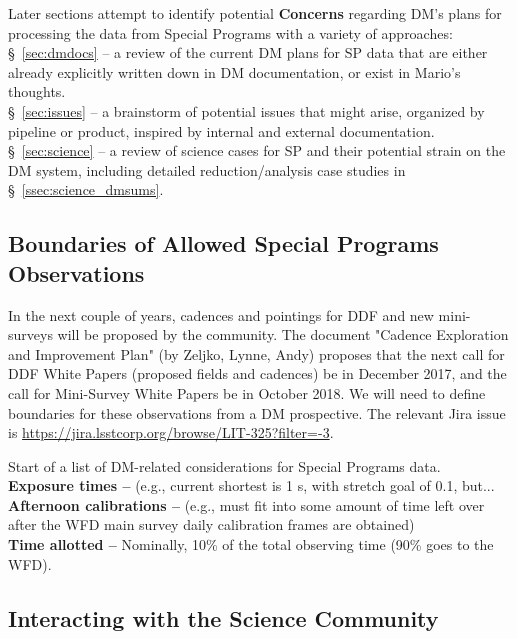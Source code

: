 \documentclass[DM,lsstdraft,toc]{lsstdoc}
\begin{document}
Later sections attempt to identify potential \textbf{Concerns} regarding DM's plans for processing the data from Special Programs with a variety of approaches: \\
\S~\ref{sec:dmdocs} -- a review of the current DM plans for SP data that are either already explicitly written down in DM documentation, or exist in Mario's thoughts. \\
\S~\ref{sec:issues} -- a brainstorm of potential issues that might arise, organized by pipeline or product, inspired by internal and external documentation. \\
\S~\ref{sec:science} -- a review of science cases for SP and their potential strain on the DM system, including detailed reduction/analysis case studies in \S~\ref{ssec:science_dmsums}. 



\clearpage
\subsection{Boundaries of Allowed Special Programs Observations}\label{ssec:intro_bounds}

In the next couple of years, cadences and pointings for DDF and new mini-surveys will be proposed by the community. The document "Cadence Exploration and Improvement Plan" (by Zeljko, Lynne, Andy) proposes that the next call for DDF White Papers (proposed fields and cadences) be in December 2017, and the call for Mini-Survey White Papers be in October 2018. We will need to define boundaries for these observations from a DM prospective. The relevant Jira issue is \url{https://jira.lsstcorp.org/browse/LIT-325?filter=-3}.

Start of a list of DM-related considerations for Special Programs data. \\
\textbf{Exposure times --} (e.g., current shortest is 1 s, with stretch goal of 0.1, but... \\
\textbf{Afternoon calibrations --} (e.g., must fit into some amount of time left over after the WFD main survey daily calibration frames are obtained) \\
\textbf{Time allotted --} Nominally, 10\% of the total observing time (90\% goes to the WFD).


\subsection{Interacting with the Science Community} \label{ssec:intro_forum}
\end{document}
